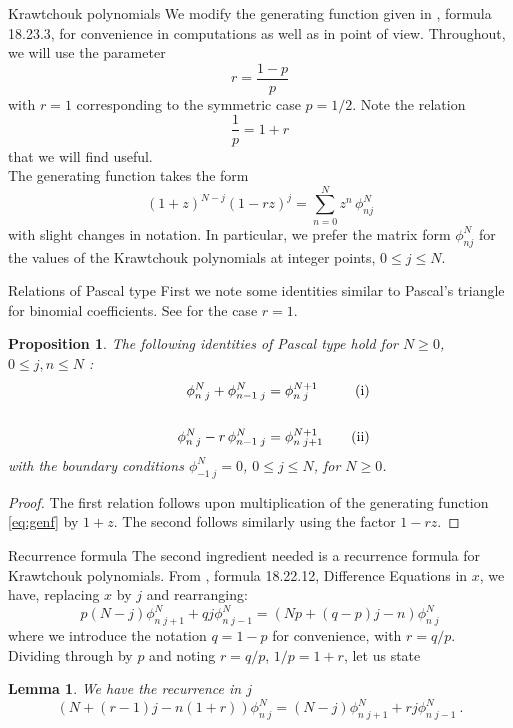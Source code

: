 \documentclass[12pt,reqno]{amsart}
\newtheorem{lemma}[theorem]{Lemma}         %
\newtheorem{proposition}[theorem]{Proposition}  %
\newcommand{\ff}[2]{\phi^{#1}_{#2}}
\begin{document}
\begin{section}{Krawtchouk polynomials}
We modify the generating function given in \cite[18.23]{DLMF}, formula 18.23.3,
for convenience in computations as well as in point of view.
Throughout, we will use the parameter
$$ r=\frac{1-p}{p}$$
with $r=1$ corresponding to the symmetric case $p=1/2$. Note the relation
$$\frac{1}{p}=1+r$$
that we will find useful.\\

The generating function takes the form
\begin{equation}\label{eq:genf}
(1+z)^{N-j}(1-rz)^j=\sum_{n=0}^N z^n\,\phi_{nj}^{N}
\end{equation}
with slight changes in notation. In particular, we prefer the matrix form $\phi_{nj}^{N}$ for the values of the Krawtchouk polynomials at integer points, $0\le  j \le N$.


\begin{subsection}{Relations of Pascal type}
First we note some identities similar to Pascal's triangle for binomial coefficients. See \cite{FK1} for the case $r=1$.

\begin{proposition}\label{prop:Pascal}
The following identities of Pascal type hold for \hfill\break $N\ge 0$, $0\le j, n \le N$ :
\begin{align*}
\qquad \ff N{n  \;j} + \ff N{n-1\;j}   &=  \ff {N+1}{n\;j}    &&&\mathrm{(i)} \\
\mathstrut \nonumber\\
\qquad \ff N{n  \;j} -r\, \ff N{n-1  \;j} &= \ff {N+1}{n\;j+1}   &&&\mathrm{(ii)}
\end{align*}
with the boundary conditions $\ff N{-1\;j}=0$, $0\le  j \le N$, for $N\ge 0$. 
\end{proposition}
\begin{proof}
The first relation follows upon multiplication of the generating function \eqref{eq:genf} by $1+z$. The second follows similarly using
the factor $1-rz$. \hfill
\end{proof}
\end{subsection}

\begin{subsection}{Recurrence formula}
The second ingredient needed is a recurrence formula for Krawtchouk polynomials. From \cite[18.22]{DLMF}, formula 18.22.12, 
Difference Equations in $x$,
we have, replacing $x$ by $j$ and rearranging:
$$p(N-j)\ff N{n\;j+1}+qj \ff N{n\;j-1}=(Np+(q-p)j-n)\ff N{n\;j} $$
where we introduce the notation $q=1-p$ for convenience, with $r=q/p$. Dividing through by $p$ and noting $r=q/p$, $1/p=1+r$, let us state
\begin{lemma}\label{lem:recj}
We have the recurrence in $j$
$$
(N+(r-1)j-n(1+r))\ff N{n\;j}=(N-j)\ff N{n\;j+1}+rj \ff N{n\;j-1} \ .
$$
\end{lemma}
\end{subsection}
\end{section}
\end{document}
